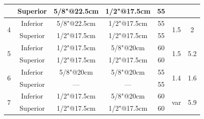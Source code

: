 \begin{table}[h!]
{\begin{tabular}{|cc|cc|c|c|c|}
\multicolumn{1}{|c|}{}                     & Superior                     & \multicolumn{1}{c|}{5/8"@22.5cm}           & 1/2"@17.5cm           & 55                        &                         &                         \\ \hline
\multicolumn{1}{|c|}{\multirow{2}{*}{4}}   & Inferior                     & \multicolumn{1}{c|}{5/8"@22.5cm}           & 1/2"@17.5cm           & 55                        & \multirow{2}{*}{1.5}    & \multirow{2}{*}{2}      \\ \cline{2-5}
\multicolumn{1}{|c|}{}                     & Superior                     & \multicolumn{1}{c|}{1/2"@17.5cm}           & 1/2"@17.5cm           & 55                        &                         &                         \\ \hline
\multicolumn{1}{|c|}{\multirow{2}{*}{5}}   & Inferior                     & \multicolumn{1}{c|}{1/2"@17.5cm}           & 5/8"@20cm             & 60                        & \multirow{2}{*}{1.5}    & \multirow{2}{*}{5.2}    \\ \cline{2-5}
\multicolumn{1}{|c|}{}                     & Superior                     & \multicolumn{1}{c|}{1/2"@17.5cm}           & 1/2"@17.5cm           & 60                        &                         &                         \\ \hline
\multicolumn{1}{|c|}{\multirow{2}{*}{6}}   & Inferior                     & \multicolumn{1}{c|}{5/8"@20cm}             & 5/8"@20cm             & 55                        & \multirow{2}{*}{1.4}    & \multirow{2}{*}{1.6}    \\ \cline{2-5}
\multicolumn{1}{|c|}{}                     & Superior                     & \multicolumn{1}{c|}{---}                   & ---                   & 55                        &                         &                         \\ \hline
\multicolumn{1}{|c|}{\multirow{2}{*}{7}}   & Inferior                     & \multicolumn{1}{c|}{1/2"@17.5cm}           & 5/8"@20cm             & 60                        & \multirow{2}{*}{var}    & \multirow{2}{*}{5.9}    \\ \cline{2-5}
\multicolumn{1}{|c|}{}                     & Superior                     & \multicolumn{1}{c|}{1/2"@17.5cm}           & 1/2"@17.5cm           & 60                        &                         &                         \\ \hline
\end{tabular}
}
\end{table}